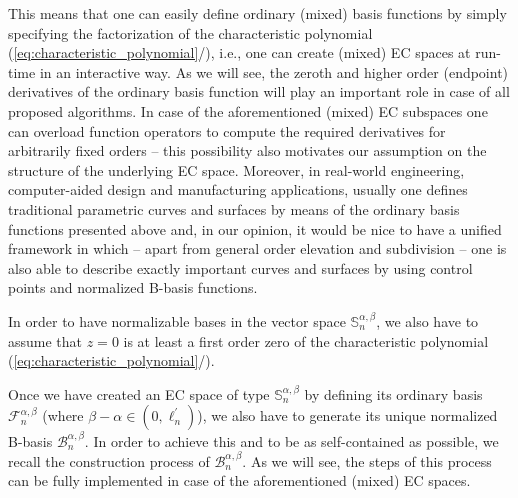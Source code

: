 \documentclass[b5paper, twosided]{book}
\DeclareRobustCommand{\mref}[1]{\ref{#1}{\relsize{-1}/\pageref{#1}}}
\begin{document}
This means that one can easily define ordinary (mixed) basis functions by simply specifying the factorization of the characteristic polynomial (\mref{eq:characteristic_polynomial}), i.e., one can create (mixed) EC spaces at run-time in an interactive way. As we will see, the zeroth and higher order (endpoint) derivatives of the ordinary basis function will play an important role in case of all proposed algorithms. In case of the aforementioned (mixed) EC subspaces one can overload function operators to compute the required derivatives for arbitrarily fixed orders -- this possibility also motivates our assumption on the structure of the underlying EC space. Moreover, in real-world engineering, computer-aided design and manufacturing applications, usually one defines traditional parametric curves and surfaces by means of the ordinary basis functions presented above and, in our opinion, it would be nice to have a unified framework in which -- apart from general order elevation and subdivision -- one is also able to describe exactly important curves and surfaces by using control points and normalized B-basis functions.

In order to have normalizable bases in the vector space $\mathbb{S}_n^{\alpha,\beta}$, we also have to assume that $z=0$ is at least a first order zero of the characteristic polynomial (\mref{eq:characteristic_polynomial}).

Once we have created an EC space of type $\mathbb{S}_n^{\alpha,\beta}$ by defining its ordinary basis $\mathcal{F}_n^{\alpha,\beta}$ (where $\beta-\alpha \in \left(0,\ell_n^{\prime}\right)$), we also have to generate its unique normalized B-basis $\mathcal{B}_n^{\alpha,\beta}$.
In order to achieve this and to be as self-contained as possible, we recall the construction process \citep{CarnicerMainarPena2004} of $\mathcal{B}_n^{\alpha,\beta}$. As we will see, the steps of this process can be fully implemented in case of the aforementioned (mixed) EC spaces.
\end{document}
